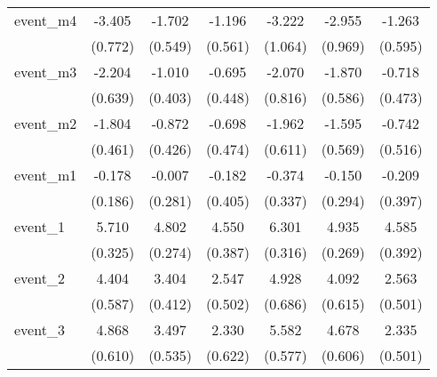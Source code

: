 {\begin{tabular}{l*{6}{c}}
event\_m4    &      -3.405\sym{***}&      -1.702\sym{**} &      -1.196\sym{*}  &      -3.222\sym{**} &      -2.955\sym{**} &      -1.263\sym{*}  \\
            &     (0.772)         &     (0.549)         &     (0.561)         &     (1.064)         &     (0.969)         &     (0.595)         \\
[1em]
event\_m3    &      -2.204\sym{***}&      -1.010\sym{*}  &      -0.695         &      -2.070\sym{*}  &      -1.870\sym{**} &      -0.718         \\
            &     (0.639)         &     (0.403)         &     (0.448)         &     (0.816)         &     (0.586)         &     (0.473)         \\
[1em]
event\_m2    &      -1.804\sym{***}&      -0.872\sym{*}  &      -0.698         &      -1.962\sym{**} &      -1.595\sym{**} &      -0.742         \\
            &     (0.461)         &     (0.426)         &     (0.474)         &     (0.611)         &     (0.569)         &     (0.516)         \\
[1em]
event\_m1    &      -0.178         &      -0.007         &      -0.182         &      -0.374         &      -0.150         &      -0.209         \\
            &     (0.186)         &     (0.281)         &     (0.405)         &     (0.337)         &     (0.294)         &     (0.397)         \\
[1em]
event\_1     &       5.710\sym{***}&       4.802\sym{***}&       4.550\sym{***}&       6.301\sym{***}&       4.935\sym{***}&       4.585\sym{***}\\
            &     (0.325)         &     (0.274)         &     (0.387)         &     (0.316)         &     (0.269)         &     (0.392)         \\
[1em]
event\_2     &       4.404\sym{***}&       3.404\sym{***}&       2.547\sym{***}&       4.928\sym{***}&       4.092\sym{***}&       2.563\sym{***}\\
            &     (0.587)         &     (0.412)         &     (0.502)         &     (0.686)         &     (0.615)         &     (0.501)         \\
[1em]
event\_3     &       4.868\sym{***}&       3.497\sym{***}&       2.330\sym{***}&       5.582\sym{***}&       4.678\sym{***}&       2.335\sym{***}\\
            &     (0.610)         &     (0.535)         &     (0.622)         &     (0.577)         &     (0.606)         &     (0.501)         \\

\end{tabular}}
